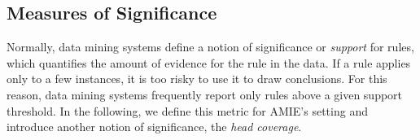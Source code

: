 
\subsection{Measures of Significance} \label{subsec:statSignificance}



Normally, data mining systems define a notion of significance or \emph{support} for rules, which quantifies the amount of evidence for the rule in the data.
If a rule applies only to a few instances, it is too risky to use it to draw conclusions. For this reason,
data mining systems frequently report only rules above a given support threshold. 
In the following, we define this metric for AMIE's setting and introduce another notion of significance, the \emph{head coverage}.


